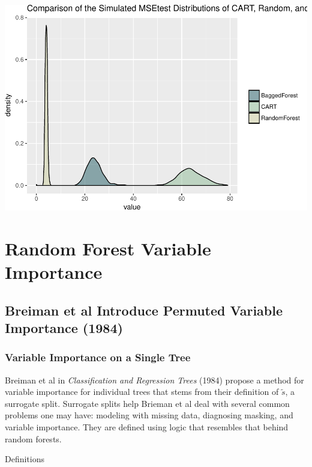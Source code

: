 \documentclass[12pt,twoside]{reedthesis}
\begin{document}
  \begin{center}\includegraphics{Thesis_files/figure-latex/fig12-1} \end{center}
  
  \chapter{Random Forest Variable
  Importance}\label{random-forest-variable-importance}
  
  \section{Breiman et al Introduce Permuted Variable Importance
  (1984)}\label{breiman-et-al-introduce-permuted-variable-importance-1984}
  
  \subsection{Variable Importance on a Single
  Tree}\label{variable-importance-on-a-single-tree}
  
  Breiman et al in \emph{Classification and Regression Trees} (1984)
  propose a method for variable importance for individual trees that stems
  from their definition of \(\tilde{s}\), a surrogate split. Surrogate
  splits help Brieman et al deal with several common problems one may
  have: modeling with missing data, diagnosing masking, and variable
  importance. They are defined using logic that resembles that behind
  random forests.
  
  Definitions
  
\end{document}
